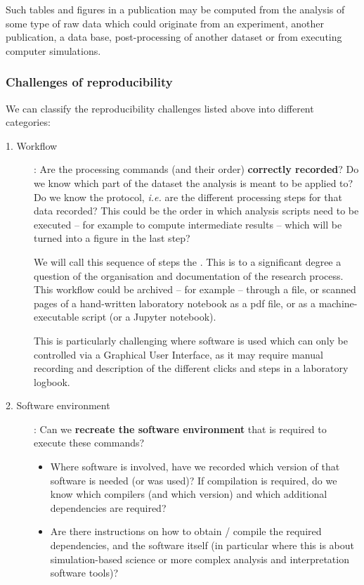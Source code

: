 Such tables and figures in a publication may be computed from the analysis of
some type of raw data which could originate from an experiment, another publication,
a data base, post-processing of another dataset or from executing computer
simulations.


\subsubsection{Challenges of reproducibility}\label{sec:reproducibility-challenges}

We can classify the reproducibility challenges listed above into different categories:

\begin{description}
\item[1. Workflow]: Are the processing commands (and their order)
\textbf{correctly recorded}? Do we know which part of the dataset the analysis is meant to be applied to? Do we know the protocol, \emph{i.e.} are the different processing steps for that data recorded? This could be the order in which analysis scripts need to be executed -- for example to compute intermediate results -- which will be turned into a figure in the last step?

We will call this sequence of steps the . This is to a significant degree a question of the organisation and documentation of the research process. This workflow could be archived -- for example -- through a  file, or scanned pages of a hand-written laboratory notebook as a pdf file, or as a
machine-executable script (or a Jupyter notebook).

This is particularly challenging where software is used which can only be
controlled via a Graphical User Interface, as it may require manual recording
and description of the different clicks and steps in a laboratory logbook.

\item[2. Software environment]: Can we \textbf{recreate the software environment} that is required to execute these commands?
\begin{itemize}
\item Where software is involved, have we recorded which version of that software is needed (or was used)? If compilation is required, do we know which compilers (and which version) and which additional dependencies are required?
\item Are there instructions on how to obtain / compile the required dependencies,
and the software itself (in particular where this is about simulation-based
science or more complex analysis and interpretation software tools)?
\end{itemize}


\end{description}
